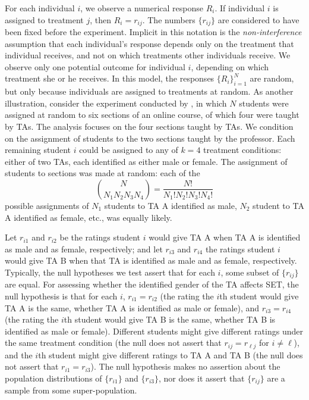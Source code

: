 \documentclass[12pt]{article}
\newcommand{\beq}{\begin{equation}}
\newcommand{\eeq}{\end{equation}}
\begin{document}
For each individual $i$, we observe a numerical response $R_i$.
If individual $i$ is assigned to treatment $j$, then $R_i = r_{ij}$.
The numbers $\{r_{ij}\}$ are considered to have been fixed before the experiment.
Implicit in this notation is the \emph{non-interference} assumption that
each individual's response depends only on the treatment that individual receives, 
and not on which treatments other individuals receive.
We observe only one potential outcome for individual $i$, 
depending on which treatment she or he receives.
In this model, the responses $\{R_i\}_{i=1}^N$ are random, but only because individuals are 
assigned to treatments at random.
As another illustration, consider the experiment conducted by \citet{MacNell2014},
in which $N$ students were assigned at random to six sections of an online course,
of which four were taught by TAs.
The analysis focuses on the four sections taught by TAs.
We condition on the assignment of students to the two sections taught by the professor.
Each remaining student $i$ could be assigned to any of $k=4$ treatment conditions:
either of two TAs, each identified as either male or female.
The assignment of students to sections was made at random: each of the
\beq
 {{N}\choose{N_1 N_2 N_3 N_4}} = \frac{N!}{N_1! N_2! N_3! N_4!}
\eeq
possible assignments of $N_1$ students to TA A identified as male,
$N_2$ student to TA A identified as female, etc., was equally likely.

Let $r_{i1}$ and $r_{i2}$ be the ratings student $i$ would give TA A when TA 
A is identified as male and as female, respectively; and let 
$r_{i3}$ and $r_{i4}$ the ratings student $i$ would give TA B when that TA
is identified as male and as female, respectively.
Typically, the null hypotheses we test assert that for each $i$, some subset of
$\{r_{ij}\}$ are  equal.
For assessing whether the identified gender of the TA affects SET,
the null hypothesis is that for each $i$,
$r_{i1} = r_{i2}$ (the rating the $i$th student would give TA A is the same,
whether TA A is identified as male or female), 
and $r_{i3} = r_{i4}$ (the rating the $i$th student would give TA B is
the same, whether TA B is identified as male or female).
Different students might give different ratings under the same treatment condition
(the null does not assert that $r_{ij} = r_{\ell j}$ for $i \ne \ell$), and
the $i$th student might 
give different ratings to TA A and TA B
(the null does not assert that $r_{i1} = r_{i3}$).
The null hypothesis makes no assertion about the population distributions of 
$\{r_{i1}\}$ and $\{r_{i3}\}$, nor does it assert that $\{r_{ij}\}$ are 
a sample from some super-population.
\end{document}
